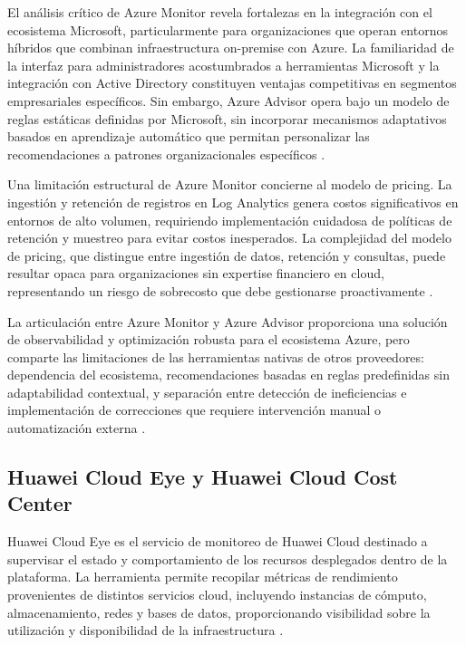 El análisis crítico de Azure Monitor revela fortalezas en la integración con el ecosistema Microsoft, particularmente para organizaciones que operan entornos híbridos que combinan infraestructura on-premise con Azure. La familiaridad de la interfaz para administradores acostumbrados a herramientas Microsoft y la integración con Active Directory constituyen ventajas competitivas en segmentos empresariales específicos. Sin embargo, Azure Advisor opera bajo un modelo de reglas estáticas definidas por Microsoft, sin incorporar mecanismos adaptativos basados en aprendizaje automático que permitan personalizar las recomendaciones a patrones organizacionales específicos \parencite{Microsoft2026}.

Una limitación estructural de Azure Monitor concierne al modelo de pricing. La ingestión y retención de registros en Log Analytics genera costos significativos en entornos de alto volumen, requiriendo implementación cuidadosa de políticas de retención y muestreo para evitar costos inesperados. La complejidad del modelo de pricing, que distingue entre ingestión de datos, retención y consultas, puede resultar opaca para organizaciones sin expertise financiero en cloud, representando un riesgo de sobrecosto que debe gestionarse proactivamente \parencite{Microsoft2026}.

La articulación entre Azure Monitor y Azure Advisor proporciona una solución de observabilidad y optimización robusta para el ecosistema Azure, pero comparte las limitaciones de las herramientas nativas de otros proveedores: dependencia del ecosistema, recomendaciones basadas en reglas predefinidas sin adaptabilidad contextual, y separación entre detección de ineficiencias e implementación de correcciones que requiere intervención manual o automatización externa \parencite{Microsoft2026}.

\subsection{Huawei Cloud Eye y Huawei Cloud Cost Center}

Huawei Cloud Eye es el servicio de monitoreo de Huawei Cloud destinado a supervisar el estado y comportamiento de los recursos desplegados dentro de la plataforma. La herramienta permite recopilar métricas de rendimiento provenientes de distintos servicios cloud, incluyendo instancias de cómputo, almacenamiento, redes y bases de datos, proporcionando visibilidad sobre la utilización y disponibilidad de la infraestructura \parencite{HuaweiCloud2026}.

